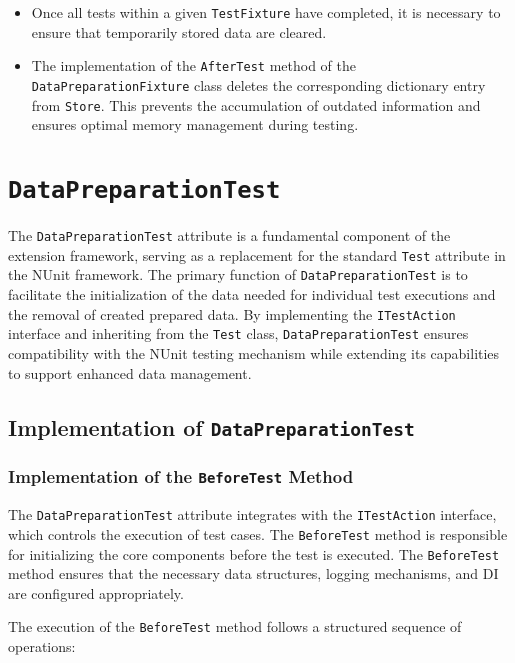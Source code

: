\begin{itemize}
    \item Once all tests within a given \texttt{TestFixture} have completed, it is necessary to ensure that temporarily stored data are cleared.
    
    \item The implementation of the \texttt{AfterTest} method of the \texttt{DataPreparationFixture} class deletes the corresponding dictionary entry from \texttt{Store}. This prevents the accumulation of outdated information and ensures optimal memory management during testing.
\end{itemize}

\section{\texttt{DataPreparationTest}}

The \texttt{DataPreparationTest} attribute is a fundamental component of the extension framework, serving as a replacement for the standard \texttt{Test} attribute in the NUnit framework. The primary function of \texttt{DataPreparationTest} is to facilitate the initialization of the data needed for individual test executions and the removal of created prepared data. By implementing the \texttt{ITestAction} interface and inheriting from the \texttt{Test} class, \texttt{DataPreparationTest} ensures compatibility with the NUnit testing mechanism while extending its capabilities to support enhanced data management.

\subsection{Implementation of \texttt{DataPreparationTest}}

\subsubsection{Implementation of the \texttt{BeforeTest} Method}

The \texttt{DataPreparationTest} attribute integrates with the \texttt{ITestAction} interface, which controls the execution of test cases. The \texttt{BeforeTest} method is responsible for initializing the core components before the test is executed. The \texttt{BeforeTest} method ensures that the necessary data structures, logging mechanisms, and \ac{DI} are configured appropriately.


The execution of the \texttt{BeforeTest} method follows a structured sequence of operations:


